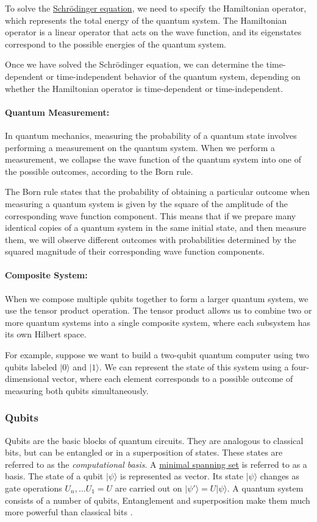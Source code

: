 \documentclass[11pt]{article}
\providecommand{\ket}[1]{|#1\rangle}
\theoremstyle{definition}
\theoremstyle{definition}
\begin{document}
To solve the \hyperref[sec:orgea3b168]{Schrödinger equation}, we need to specify the Hamiltonian
 operator, which represents the total energy of the quantum system. The
 Hamiltonian operator is a linear operator that acts on the wave function,
 and its eigenstates correspond to the possible energies of the quantum
 system.

Once we have solved the Schrödinger equation, we can determine the
time-dependent or time-independent behavior of the quantum system,
depending on whether the Hamiltonian operator is time-dependent or
time-independent.

\paragraph{Quantum Measurement:}
\label{sec:orgcc3f76e}
In quantum mechanics, measuring the probability of a quantum state involves
performing a measurement on the quantum system. When we perform a
measurement, we collapse the wave function of the quantum system into one
of the possible outcomes, according to the Born rule.

The Born rule states that the probability of obtaining a particular
outcome when measuring a quantum system is given by the square of the
amplitude of the corresponding wave function component. This means that if
we prepare many identical copies of a quantum system in the same initial
state, and then measure them, we will observe different outcomes with
probabilities determined by the squared magnitude of their corresponding
wave function components.

\paragraph{Composite System:}
\label{sec:orga91aa12}
When we compose multiple qubits together to form a larger quantum system, we
use the tensor product operation. The tensor product allows us to combine
two or more quantum systems into a single composite system, where each
subsystem has its own Hilbert space.

For example, suppose we want to build a two-qubit quantum computer using two
qubits labeled \(\ket{0}\) and \(\ket{1}\). We can represent the state of this system
using a four-dimensional vector, where each element corresponds to a
possible outcome of measuring both qubits simultaneously.


\subsubsection{Qubits}
\label{sec:org8306e81}
Qubits are the basic blocks of quantum circuits. They are analogous to classical
bits, but can be entangled or in a superposition of states.
These states are referred to as the \emph{computational basis}.
A \hyperref[sec:orgf9b81f4]{minimal spanning set} is referred to as a basis.
The state of a qubit \(\ket{\psi}\) is represented as vector.
Its state \(\ket{\psi}\) changes as gate operations \(U_n, \ldots U_1 = U\)
are carried out on \(\ket{\psi'} = U\ket{\psi}\).
A quantum system consists of a number of qubits,
Entanglement and superposition make them much more powerful than classical
bits \cite{williams_explorations_2011}.
\end{document}

